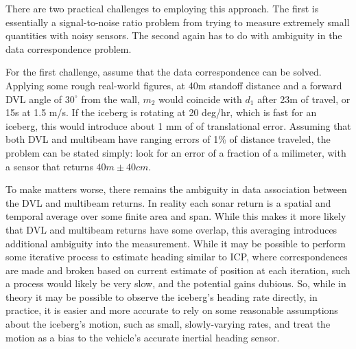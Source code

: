 There are two practical challenges to employing this approach. The first is essentially a signal-to-noise ratio problem from trying to measure extremely small quantities with noisy sensors. The second again has to do with ambiguity in the data correspondence problem. 

For the first challenge, assume that the data correspondence can be solved. Applying some rough real-world figures, at 40m standoff distance and a forward DVL angle of $30^\circ$ from the wall, $m_2$ would coincide with $d_1$ after 23m of travel, or 15s at 1.5 m/s. If the iceberg is rotating at 20 deg/hr, which is fast for an iceberg, this would introduce about 1 mm of of translational error. Assuming that both DVL and multibeam have ranging errors of 1\% of distance traveled, the problem can be stated simply: look for an error of a fraction of a milimeter, with a sensor that returns $40m \pm 40 cm$.

To make matters worse, there remains the ambiguity in data association between the DVL and multibeam returns. In reality each sonar return is a spatial and temporal average over some finite area and span. While this makes it more likely that DVL and multibeam returns have some overlap, this averaging introduces additional ambiguity into the measurement. While it may be possible to perform some iterative process to estimate heading similar to ICP, where correspondences are made and broken based on current estimate of position at each iteration, such a process would likely be very slow, and the potential gains dubious. So, while in theory it may be possible to observe the iceberg's heading rate directly, in practice, it is easier and more accurate to rely on some reasonable assumptions about the iceberg's motion, such as small, slowly-varying rates, and treat the motion as a bias to the vehicle's accurate inertial heading sensor.






